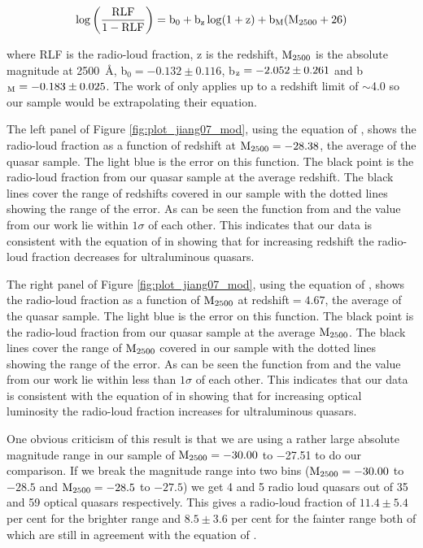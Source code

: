 \documentclass[a4paper,fleqn,usenatbib]{mnras}
\newcommand{\around}{$\sim$}
\begin{document}
\begin{equation}
\rm \log \left( \frac{RLF}{1-RLF} \right) = b_0 + b_z \log(1+z) + b_M (M_{2500}+26)
\end{equation}

where RLF is the radio-loud fraction, z is the redshift, $\rm M_{2500}$ is the absolute magnitude at 2500~\AA, b$_0 = -0.132 \pm 0.116$, b$\rm _z = -2.052 \pm 0.261$ and b$\rm _M = -0.183 \pm 0.025$.  The work of \citet{jiang07} only applies up to a redshift limit of \around 4.0 so our sample would be extrapolating their equation.

The left panel of Figure \ref{fig:plot_jiang07_mod}, using the equation of \citet{jiang07}, shows the radio-loud fraction as a function of redshift at $\rm M_{2500} = -28.38$, the average of the quasar sample.  The light blue is the error on this function.  The black point is the radio-loud fraction from our quasar sample at the average redshift.  The black lines cover the range of redshifts covered in our sample with the dotted lines showing the range of the error.  As can be seen the function from \citet{jiang07} and the value from our work lie within $1 \sigma$ of each other.  This indicates that our data is consistent with the equation of \citet{jiang07} in showing that for increasing redshift the radio-loud fraction decreases for ultraluminous quasars.   

The right panel of Figure \ref{fig:plot_jiang07_mod}, using the equation of \citet{jiang07}, shows the radio-loud fraction as a function of $\rm M_{2500}$ at redshift$= 4.67$, the average of the quasar sample.  The light blue is the error on this function.  The black point is the radio-loud fraction from our quasar sample at the average $\rm M_{2500}$.  The black lines cover the range of $\rm M_{2500}$ covered in our sample with the dotted lines showing the range of the error.  As can be seen the function from \citet{jiang07} and the value from our work lie within less than $1 \sigma$ of each other.  This indicates that our data is consistent with the equation of \citet{jiang07} in showing that for increasing optical luminosity the radio-loud fraction increases for ultraluminous quasars. 

One obvious criticism of this result is that we are using a rather large absolute magnitude range in our sample of $\rm M_{2500} = -30.00$ to $-$27.51 to do our comparison.  If we break the magnitude range into two bins ($\rm M_{2500} = -30.00$ to $-28.5$ and $\rm M_{2500} = -28.5$ to $-27.5$) we get 4 and 5 radio loud quasars out of 35 and 59 optical quasars respectively.  This gives a radio-loud fraction of $11.4 \pm 5.4$ per cent for the brighter range and $8.5 \pm 3.6$ per cent for the fainter range both of which are still in agreement with the equation of \citet{jiang07}.
\end{document}
